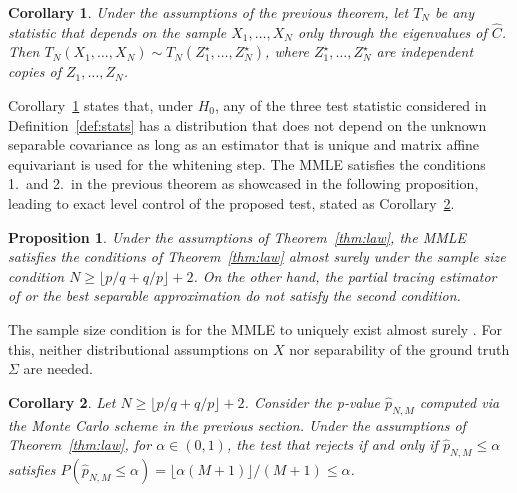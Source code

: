 \documentclass[12pt]{article}
\newtheorem{proposition}{Proposition}
\newtheorem{corollary}{Corollary}
\begin{document}
\begin{corollary}\label{cor:cor_of_thm2}
     Under the assumptions of the previous theorem, let $T_N$ be any statistic that depends on the sample $X_1,\ldots,X_N$ only through the eigenvalues of
$\widehat{C}$.\\ Then $T_N(X_1,\ldots,X_N) \sim T_N(Z_1^\star,\ldots,Z_N^\star)$, where $Z_1^\star,\ldots,Z_N^\star$ are independent copies of $Z_1,\ldots,Z_N$.
\end{corollary}

Corollary~\ref{cor:cor_of_thm2} states that, under $H_0$, any of the three test statistic considered in Definition~\ref{def:stats} has a distribution that does not depend on the unknown separable covariance
as long as an estimator that is unique and matrix affine equivariant is used for the whitening step. The MMLE satisfies the conditions 1.~and 2.~in the previous theorem as showcased in the following proposition, leading to exact level control of the proposed test, stated as Corollary~\ref{cor:exact_level}.




\begin{proposition}\label{prop:MMLE}
    Under the assumptions of Theorem~\ref{thm:law}, the MMLE satisfies the conditions of Theorem~\ref{thm:law} almost surely under the sample size condition $N \geq \lfloor p/q+q/p \rfloor  + 2$. 
    On the other hand, the partial tracing estimator of \citet{aston2017tests} or the best separable approximation \citep{genton2007separable,masak2023separable} do not satisfy the second condition.
\end{proposition}


The sample size condition is for the MMLE to uniquely exist almost surely \citep[it is a sufficient, and almost necessary condition -- almost due to edge cases, cf.][]{drton2021}.
For this, neither distributional assumptions on $X$ nor  separability of the ground truth $\Sigma$ are needed.


\begin{corollary}\label{cor:exact_level}
Let $N \geq \lfloor p/q+q/p \rfloor  + 2$. Consider the p-value $\widehat{p}_{N,M}$ computed via the Monte Carlo scheme in the previous section. Under the assumptions of Theorem~\ref{thm:law}, for $\alpha \in (0,1)$, the test that rejects if and only if $\widehat{p}_{N,M} \leq \alpha$ satisfies $P(\widehat{p}_{N,M} \leq \alpha) = \lfloor \alpha (M+1) \rfloor / (M+1) \leq \alpha$.
\end{corollary}
\end{document}
